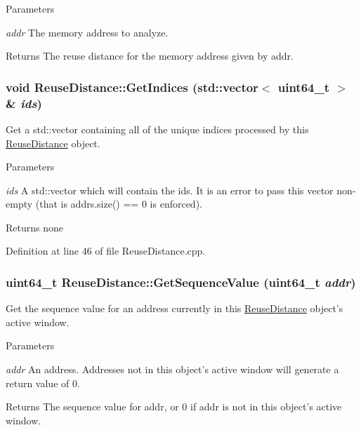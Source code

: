 \begin{DoxyParams}{Parameters}
\item[{\em addr}]The memory address to analyze.\end{DoxyParams}
\begin{DoxyReturn}{Returns}
The reuse distance for the memory address given by addr. 
\end{DoxyReturn}
\hypertarget{class_reuse_distance_a99fb4b3aae663676515ad354691b7cc6}{
\subsubsection[{GetIndices}]{\setlength{\rightskip}{0pt plus 5cm}void ReuseDistance::GetIndices (std::vector$<$ uint64\_\-t $>$ \& {\em ids})}}
\label{class_reuse_distance_a99fb4b3aae663676515ad354691b7cc6}
Get a std::vector containing all of the unique indices processed by this \hyperlink{class_reuse_distance}{ReuseDistance} object.


\begin{DoxyParams}{Parameters}
\item[{\em ids}]A std::vector which will contain the ids. It is an error to pass this vector non-\/empty (that is addrs.size() == 0 is enforced).\end{DoxyParams}
\begin{DoxyReturn}{Returns}
none 
\end{DoxyReturn}


Definition at line 46 of file ReuseDistance.cpp.

\hypertarget{class_reuse_distance_ac849305d7ca15a5099956d0a89c929a7}{
\subsubsection[{GetSequenceValue}]{\setlength{\rightskip}{0pt plus 5cm}uint64\_\-t ReuseDistance::GetSequenceValue (uint64\_\-t {\em addr})}}
\label{class_reuse_distance_ac849305d7ca15a5099956d0a89c929a7}
Get the sequence value for an address currently in this \hyperlink{class_reuse_distance}{ReuseDistance} object's active window.


\begin{DoxyParams}{Parameters}
\item[{\em addr}]An address. Addresses not in this object's active window will generate a return value of 0.\end{DoxyParams}
\begin{DoxyReturn}{Returns}
The sequence value for addr, or 0 if addr is not in this object's active window. 
\end{DoxyReturn}


